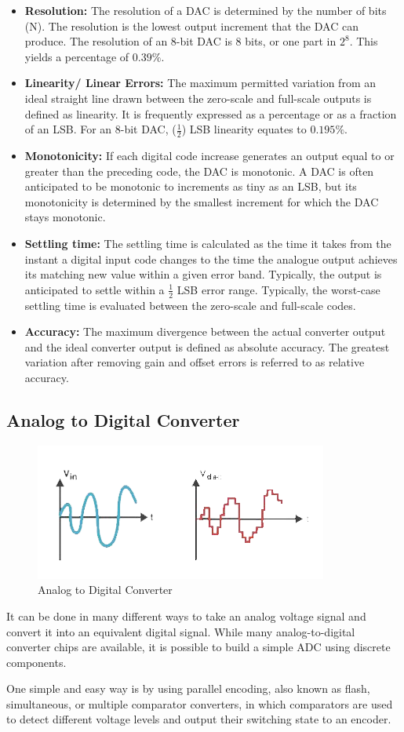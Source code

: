 		\begin{itemize}
			\item \textbf{Resolution:} The resolution of a DAC is determined by the number of bits (N). The resolution is the lowest output increment that the DAC can produce. The resolution of an 8-bit DAC is 8 bits, or one part in $2^8$. This yields a percentage of $0.39\%$.
			\item \textbf{Linearity/ Linear Errors:} The maximum permitted variation from an ideal straight line drawn between the zero-scale and full-scale outputs is defined as linearity. It is frequently expressed as a percentage or as a fraction of an LSB. For an 8-bit DAC, ($\frac{1}{2}$) LSB linearity equates to $0.195\%$.
			\item \textbf{Monotonicity:} If each digital code increase generates an output equal to or greater than the preceding code, the DAC is monotonic. A DAC is often anticipated to be monotonic to increments as tiny as an LSB, but its monotonicity is determined by the smallest increment for which the DAC stays monotonic.
			\item \textbf{Settling time:} The settling time is calculated as the time it takes from the instant a digital input code changes to the time the analogue output achieves its matching new value within a given error band. Typically, the output is anticipated to settle within a $\frac{1}{2}$ LSB error range. Typically, the worst-case settling time is evaluated between the zero-scale and full-scale codes.
			\item \textbf{Accuracy:} The maximum divergence between the actual converter output and the ideal converter output is defined as absolute accuracy. The greatest variation after removing gain and offset errors is referred to as relative accuracy.
		\end{itemize}

	\subsection{Analog to Digital Converter}
		\begin{figure}[H]
			\centering
			\label{theory:1}
			\includegraphics[width=0.6\columnwidth]{images/theory1.png}
			\caption{Analog to Digital Converter}
		\end{figure}

		It can be done in many different ways to take an analog voltage signal and convert it into an equivalent digital signal. While many analog-to-digital converter chips are available, it is possible to build a simple ADC using discrete components.

		One simple and easy way is by using parallel encoding, also known as flash, simultaneous, or multiple comparator converters, in which comparators are used to detect different voltage levels and output their switching state to an encoder.
